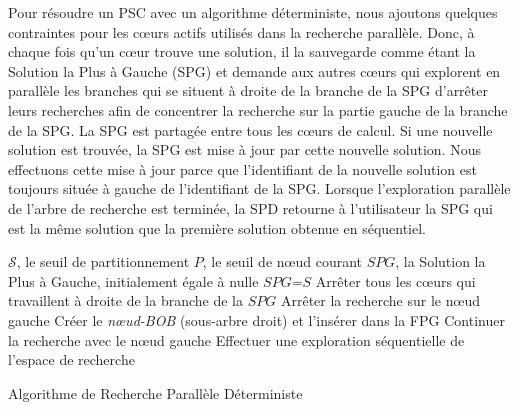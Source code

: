 \documentclass[parallelisme]{compas2014}
\begin{document}
Pour résoudre un PSC avec un algorithme déterministe, nous ajoutons quelques contraintes pour les cœurs actifs utilisés dans la recherche parallèle. Donc, à chaque fois qu'un cœur trouve une solution, il la sauvegarde comme étant la Solution la Plus à Gauche (SPG) et demande aux autres cœurs qui explorent en parallèle les branches qui se situent à droite de la branche de la SPG d'arrêter leurs recherches afin de concentrer la recherche sur la partie gauche de la branche de la SPG. La SPG est partagée entre tous les cœurs de calcul. Si une nouvelle solution est trouvée, la SPG est mise à jour par cette nouvelle solution. Nous effectuons cette mise à jour parce que l'identifiant de la nouvelle solution est toujours située à gauche de l'identifiant de la SPG. Lorsque l'exploration parallèle de l'arbre de recherche est terminée, la SPD retourne à l'utilisateur la SPG qui est la même solution que la première solution obtenue en séquentiel.

\begin{algorithm}[t]
\begin{algorithmic}
\REQUIRE $\mathcal{S}$, le seuil de partitionnement
\STATE $P$, le seuil de nœud courant 
\STATE $SPG$, la Solution la Plus à Gauche, initialement égale à nulle
        		\STATE $SPG$=$S$
	        \STATE Arrêter tous les cœurs qui travaillent à droite de la branche de la $SPG$
        \ENDIF
\ELSE
        \STATE Arrêter la recherche sur le nœud gauche
        \STATE Créer le \textit{nœud-BOB} (sous-arbre droit) et l'insérer dans la FPG
        \STATE Continuer la recherche avec le nœud gauche
	\ELSE
     	\STATE Effectuer une exploration séquentielle de l'espace de recherche
    \ENDIF
\ENDIF  
\end{algorithmic}
\caption{Algorithme de Recherche Parallèle Déterministe}
\label{Algo1}
\end{algorithm}
\end{document}
